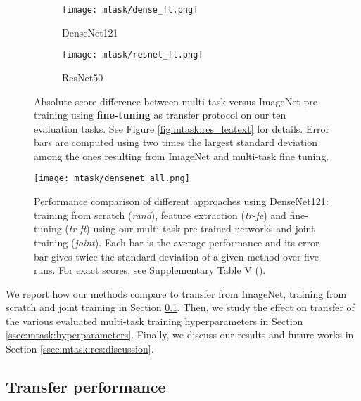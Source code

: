 \begin{figure}[t]
    \centering
    \begin{subfigure}[t]{0.70\textwidth}
        \centering
        \texttt{[image: mtask/dense\_ft.png]}
        \caption{DenseNet121}
    \end{subfigure}    
    \begin{subfigure}[t]{0.70\textwidth}
        \centering
        \texttt{[image: mtask/resnet\_ft.png]}\\
        \caption{ResNet50}
    \end{subfigure}    
    \caption{Absolute score difference between multi-task versus ImageNet pre-training using \textbf{fine-tuning} as transfer protocol on our ten evaluation tasks. See Figure \ref{fig:mtask:res_featext} for details. Error bars are computed using two times the largest standard deviation among the ones resulting from ImageNet and multi-task fine tuning.}  
    \label{fig:mtask:res_finetune}
\end{figure}

\begin{figure}[t]
    \centering
    \texttt{[image: mtask/densenet\_all.png]}
    \caption{Performance comparison of different approaches using DenseNet121: training from scratch (\textit{rand}), feature extraction (\textit{tr-fe}) and fine-tuning (\textit{tr-ft}) using our multi-task pre-trained networks and joint training (\textit{joint}). Each bar is the average performance and its error bar gives twice the standard deviation of a given method over five runs. For exact scores, see Supplementary Table V ().}  
    \label{fig:mtask:res_all_densenet}
\end{figure}

We report how our methods compare to transfer from ImageNet, training from scratch and joint training in Section \ref{ssec:mtask:transfer_perfromance}. Then, we study the effect on transfer of the various evaluated multi-task training hyperparameters in Section \ref{ssec:mtask:hyperparameters}. Finally, we discuss our results and future works in Section \ref{ssec:mtask:res:discussion}.

\subsection{Transfer performance}
\label{ssec:mtask:transfer_perfromance}


